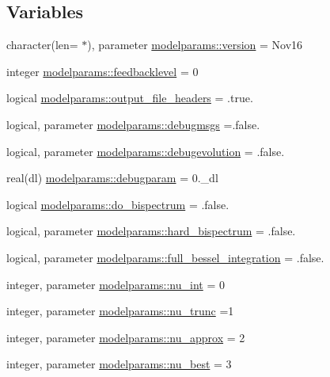 \subsection*{Variables}
\begin{DoxyCompactItemize}
\item 
character(len= $\ast$), parameter \mbox{\hyperlink{namespacemodelparams_ae4691876bb5eed2cdd64ae8eca39dc32}{modelparams\+::version}} = \textquotesingle{}Nov16\textquotesingle{}
\item 
integer \mbox{\hyperlink{namespacemodelparams_a403353ede075646b189fcfbae0fb3396}{modelparams\+::feedbacklevel}} = 0
\item 
logical \mbox{\hyperlink{namespacemodelparams_aa59993fb52b4f0010f0587e10f27b792}{modelparams\+::output\+\_\+file\+\_\+headers}} = .true.
\item 
logical, parameter \mbox{\hyperlink{namespacemodelparams_a2fccc38c501c6f494fa1ced55e52a983}{modelparams\+::debugmsgs}} =.false.
\item 
logical, parameter \mbox{\hyperlink{namespacemodelparams_a69b1cd59448404e0bcd21612fb8e69c9}{modelparams\+::debugevolution}} = .false.
\item 
real(dl) \mbox{\hyperlink{namespacemodelparams_a35a694469321a4414b622d9a0ec18f1f}{modelparams\+::debugparam}} = 0.\+\_\+dl
\item 
logical \mbox{\hyperlink{namespacemodelparams_aa42e1180e92882f566f30d970dc110a4}{modelparams\+::do\+\_\+bispectrum}} = .false.
\item 
logical, parameter \mbox{\hyperlink{namespacemodelparams_a0dda4d3f4b77e14c2635221cdf01de0f}{modelparams\+::hard\+\_\+bispectrum}} = .false.
\item 
logical, parameter \mbox{\hyperlink{namespacemodelparams_a62664016ce9ca8fc8e53ebbfb8caa09c}{modelparams\+::full\+\_\+bessel\+\_\+integration}} = .false.
\item 
integer, parameter \mbox{\hyperlink{namespacemodelparams_a6886b2553f1b2657b012618d5377619d}{modelparams\+::nu\+\_\+int}} = 0
\item 
integer, parameter \mbox{\hyperlink{namespacemodelparams_a31f4e37e9eb0841e803020950fe2ce52}{modelparams\+::nu\+\_\+trunc}} =1
\item 
integer, parameter \mbox{\hyperlink{namespacemodelparams_ac509ce908abffae5d206533cc7eddfe9}{modelparams\+::nu\+\_\+approx}} = 2
\item 
integer, parameter \mbox{\hyperlink{namespacemodelparams_a1da306d0a7758bf910362b6d62e6658f}{modelparams\+::nu\+\_\+best}} = 3

\end{DoxyCompactItemize}
